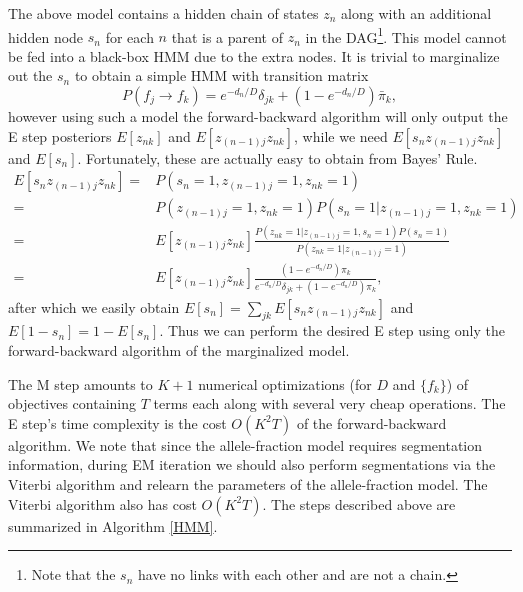 \documentclass[nofootinbib,amssymb,amsmath]{revtex4}
\begin{document}
The above model contains a hidden chain of states $z_n$ along with an additional hidden node $s_n$ for each $n$ that is a parent of $z_n$ in the DAG\footnote{Note that the $s_n$ have no links with each other and are not a chain.}.  This model cannot be fed into a black-box HMM due to the extra nodes.  It is trivial to marginalize out the $s_n$ to obtain a simple HMM with transition matrix
\begin{equation}
P(f_j \rightarrow f_k) = e^{-d_n/D} \delta_{jk}  + (1-e^{-d_n/D}) \bar{\pi}_k,
\label{transition}
\end{equation}
however using such a model the forward-backward algorithm will only output the E step posteriors $E[z_{nk}]$ and $E[z_{(n-1)j} z_{nk}]$, while we need $E[s_n z_{(n-1)j} z_{nk}]$ and $E[s_n]$.  Fortunately, these are actually easy to obtain from Bayes' Rule.
%
\begin{align}
E \left[s_n  z_{(n-1)j} z_{nk} \right] =& P(s_n = 1, z_{(n-1)j} = 1, z_{nk} = 1) \\
=& P(z_{(n-1)j} = 1,  z_{nk} = 1) P(s_n = 1| z_{(n-1)j} = 1, z_{nk} = 1) \\
=& E[z_{(n-1)j} z_{nk}] \frac{ P(z_{nk} = 1 | z_{(n-1)j} = 1, s_n = 1 ) P(s_n = 1) }{ P(z_{nk} = 1 | z_{(n-1)j} = 1)} \\
=& E[z_{(n-1)j} z_{nk}] \frac{  (1 - e^{-d_n/D}) \pi_k }{ e^{-d_n/D} \delta_{jk} + (1 - e^{-d_n/D}) \pi_k},
\label{augmented_posterior}
\end{align}
%
after which we easily obtain $E[s_n] = \sum_{jk} E \left[s_n  z_{(n-1)j} z_{nk} \right]$ and $E[1-s_n] = 1 - E[s_n]$.  Thus we can perform the desired E step using only the forward-backward algorithm of the marginalized model.

The M step amounts to $K + 1$ numerical optimizations (for $D$ and $\{ f_k \}$) of objectives containing $T$ terms each along with several very cheap operations.  The E step's time complexity is the cost $O(K^2 T)$ of the forward-backward algorithm.  We note that since the allele-fraction model requires segmentation information, during EM iteration we should also perform segmentations via the Viterbi algorithm and relearn the parameters of the allele-fraction model.  The Viterbi algorithm also has cost $O(K^2 T)$.  The steps described above are summarized in Algorithm \ref{HMM}.
\end{document}
